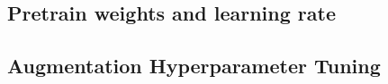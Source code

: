 \subsection{Pretrain weights and learning rate} \label{results:pretrained}

\subsection{Augmentation Hyperparameter Tuning}

